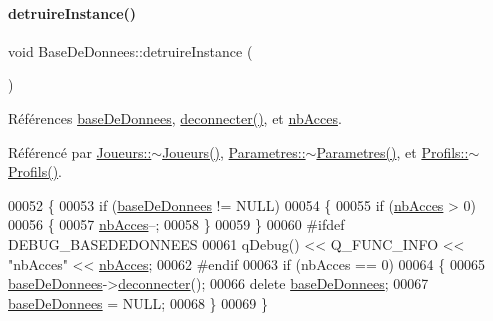 \paragraph{\texorpdfstring{detruire\+Instance()}{detruireInstance()}}
{\footnotesize\ttfamily void Base\+De\+Donnees\+::detruire\+Instance (\begin{DoxyParamCaption}{ }\end{DoxyParamCaption})\hspace{0.3cm}{\ttfamily [static]}}



Références \hyperlink{class_base_de_donnees_a822ba0b7cf85b1e48ced8efd3d65e266}{base\+De\+Donnees}, \hyperlink{class_base_de_donnees_ae780999d25a26a0e4dbe0706a4785978}{deconnecter()}, et \hyperlink{class_base_de_donnees_a5099ecb2922bb31d84cd5d4505298a29}{nb\+Acces}.



Référencé par \hyperlink{class_joueurs_ab2b4280d9ad7be92ef78c2ca15755318}{Joueurs\+::$\sim$\+Joueurs()}, \hyperlink{class_parametres_a83068e95596ef05b4307b43b67ffc24d}{Parametres\+::$\sim$\+Parametres()}, et \hyperlink{class_profils_a71dfd5d2637dd4020a75e18fe08a8d5a}{Profils\+::$\sim$\+Profils()}.


\begin{DoxyCode}
00052 \{    
00053     \textcolor{keywordflow}{if} (\hyperlink{class_base_de_donnees_a822ba0b7cf85b1e48ced8efd3d65e266}{baseDeDonnees} != NULL)
00054     \{
00055         \textcolor{keywordflow}{if} (\hyperlink{class_base_de_donnees_a5099ecb2922bb31d84cd5d4505298a29}{nbAcces} > 0)
00056         \{
00057             \hyperlink{class_base_de_donnees_a5099ecb2922bb31d84cd5d4505298a29}{nbAcces}--;
00058         \}
00059     \}
00060 \textcolor{preprocessor}{    #ifdef DEBUG\_BASEDEDONNEES}
00061     qDebug() << Q\_FUNC\_INFO << \textcolor{stringliteral}{"nbAcces"} << \hyperlink{class_base_de_donnees_a5099ecb2922bb31d84cd5d4505298a29}{nbAcces};
00062 \textcolor{preprocessor}{    #endif}
00063     \textcolor{keywordflow}{if} (nbAcces == 0)
00064     \{
00065         \hyperlink{class_base_de_donnees_a822ba0b7cf85b1e48ced8efd3d65e266}{baseDeDonnees}->\hyperlink{class_base_de_donnees_ae780999d25a26a0e4dbe0706a4785978}{deconnecter}();
00066         \textcolor{keyword}{delete} \hyperlink{class_base_de_donnees_a822ba0b7cf85b1e48ced8efd3d65e266}{baseDeDonnees};
00067         \hyperlink{class_base_de_donnees_a822ba0b7cf85b1e48ced8efd3d65e266}{baseDeDonnees} = NULL;
00068     \}
00069 \}
\end{DoxyCode}
\mbox{\label{class_base_de_donnees_a00388973f3ec42e5c8e76e7af7e124b2}} 
